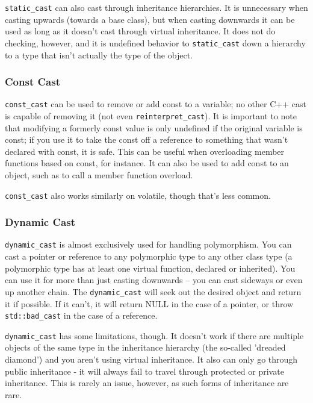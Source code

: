 \verb$static_cast$ can also cast through inheritance hierarchies.  It is
unnecessary when casting upwards (towards a base class), but when
casting downwards it can be used as long as it doesn't cast through
virtual inheritance.  It does not do checking, however, and it is
undefined behavior to \verb$static_cast$ down a hierarchy to a type that
isn't actually the type of the object.

\subsubsection{Const Cast}

\verb$const_cast$ can be used to remove or add const to a variable; no
other C++ cast is capable of removing it (not even
\verb$reinterpret_cast$).  It is important to note that modifying a
formerly const value is only undefined if the original variable is
const; if you use it to take the const off a reference to something
that wasn't declared with const, it is safe.  This can be useful when
overloading member functions based on const, for instance.  It can
also be used to add const to an object, such as to call a member
function overload.

\verb$const_cast$ also works similarly on volatile, though that's less
common.

\subsubsection{Dynamic Cast}

\verb$dynamic_cast$ is almost exclusively used for handling polymorphism.
You can cast a pointer or reference to any polymorphic type to any
other class type (a polymorphic type has at least one virtual
function, declared or inherited).  You can use it for more than just
casting downwards -- you can cast sideways or even up another chain.
The \verb$dynamic_cast$ will seek out the desired object and return it if
possible.  If it can't, it will return NULL in the case of a pointer,
or throw \verb$std::bad_cast$ in the case of a reference.

\verb$dynamic_cast$ has some limitations, though.  It doesn't work if there
are multiple objects of the same type in the inheritance hierarchy
(the so-called 'dreaded diamond') and you aren't using virtual
inheritance.  It also can only go through public inheritance - it will
always fail to travel through protected or private inheritance.  This
is rarely an issue, however, as such forms of inheritance are rare.

